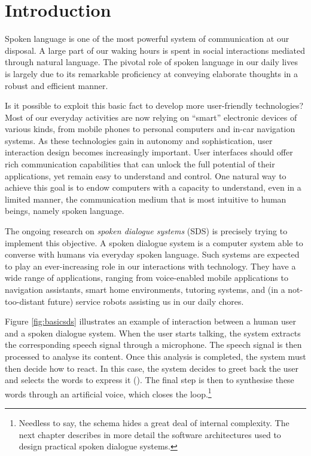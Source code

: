 
\chapter{Introduction}
\setcounter{page}{1}

Spoken language is one of the most powerful system of communication at our disposal. A large part of our waking hours is spent in social interactions mediated through natural language.  The pivotal role of spoken language in our daily lives is largely due to its remarkable proficiency at conveying elaborate thoughts in a robust and efficient manner. 

Is it possible to exploit this basic fact to develop more user-friendly technologies? Most of our everyday activities are now relying on ``smart'' electronic devices of various kinds, from mobile phones to personal computers and in-car navigation systems. As these technologies gain in autonomy and sophistication, user interaction design becomes increasingly important. User interfaces should offer rich communication capabilities that can unlock the full potential of their applications, yet remain easy to understand and control.  One natural way to achieve this goal is to endow computers with a capacity to understand, even in a limited manner, the communication medium that is most intuitive to human beings, namely spoken language.  

The ongoing research on \textit{spoken dialogue systems} (SDS) is precisely trying to implement this objective. A spoken dialogue system is a computer system able to converse with humans via everyday spoken language. Such systems are expected to play an ever-increasing role in our interactions with technology. They have a wide range of applications, ranging from voice-enabled mobile applications to navigation assistants, smart home environments, tutoring systems, and (in a not-too-distant future) service robots assisting us in our daily chores.

Figure \ref{fig:basicsds} illustrates an example of interaction between a human user and a spoken dialogue system. When the user starts talking, the system extracts the corresponding speech signal through a microphone.  The speech signal is then processed to analyse its content.  Once this analysis is completed, the system must then decide how to react.  In this case, the system decides to greet back the user and selects the words to express it (). The final step is then to synthesise these words through an artificial voice, which closes the loop.\footnote{ Needless to say, the schema hides a great deal of internal complexity.  The next chapter describes in more detail the software architectures used to design practical spoken dialogue systems.}

